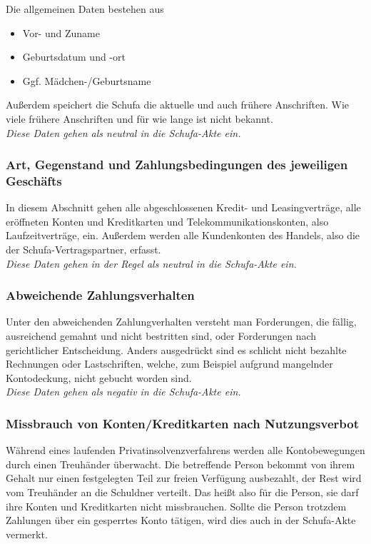 \documentclass[12pt]{article}
\begin{document}
Die allgemeinen Daten bestehen aus
\begin{itemize}
\item Vor- und Zuname
\item Geburtsdatum und -ort
\item Ggf. Mädchen-/Geburtsname
\end{itemize}

Außerdem speichert die Schufa die aktuelle und auch frühere Anschriften. Wie viele frühere Anschriften und für wie lange ist nicht bekannt.\\

\textit{Diese Daten gehen als neutral in die Schufa-Akte ein.}



\subsubsection*{Art, Gegenstand und Zahlungsbedingungen des jeweiligen Geschäfts}
In diesem Abschnitt gehen alle abgeschlossenen Kredit- und Leasingverträge, alle eröffneten Konten und Kreditkarten und Telekommunikationskonten, also Laufzeitverträge, ein.
Außerdem werden alle Kundenkonten des Handels, also die der Schufa-Vertragspartner, erfasst.\\

\textit{Diese Daten gehen in der Regel als neutral in die Schufa-Akte ein.}



\subsubsection*{Abweichende Zahlungsverhalten}
Unter den abweichenden Zahlungverhalten versteht man Forderungen, die fällig, ausreichend gemahnt und nicht bestritten sind, oder Forderungen nach gerichtlicher Entscheidung.
Anders ausgedrückt sind es schlicht nicht bezahlte Rechnungen oder Lastschriften, welche, zum Beispiel aufgrund mangelnder Kontodeckung, nicht gebucht worden sind.\\

\textit{Diese Daten gehen als negativ in die Schufa-Akte ein.} 



\subsubsection*{Missbrauch von Konten/Kreditkarten nach Nutzungsverbot}
Während eines laufenden Privatinsolvenzverfahrens werden alle Kontobewegungen durch einen Treuhänder überwacht. Die betreffende Person bekommt von ihrem Gehalt nur einen festgelegten Teil zur freien 
Verfügung ausbezahlt, der Rest wird vom Treuhänder an die Schuldner verteilt. Das heißt also für die Person, sie darf ihre Konten und Kreditkarten nicht \glqq missbrauchen\grqq.
Sollte die Person trotzdem Zahlungen über ein gesperrtes Konto tätigen, wird dies auch in der Schufa-Akte vermerkt.\\
\end{document}
